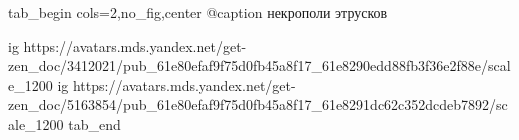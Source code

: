  
 
 
 
 

\ifcmt
tab_begin cols=2,no_fig,center
  @caption некрополи этрусков

  ig https://avatars.mds.yandex.net/get-zen_doc/3412021/pub_61e80efaf9f75d0fb45a8f17_61e8290edd88fb3f36e2f88e/scale_1200
  ig https://avatars.mds.yandex.net/get-zen_doc/5163854/pub_61e80efaf9f75d0fb45a8f17_61e8291dc62c352dcdeb7892/scale_1200
tab_end
\fi
